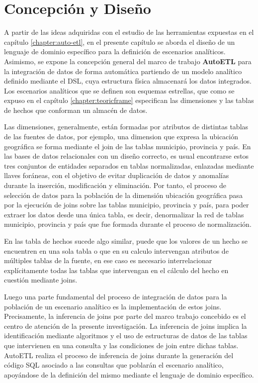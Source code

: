 \chapter{Concepción y Diseño}\label{chapter:proposal}

A partir de las ideas adquiridas con el estudio de las herramientas expuestas en el cap\'itulo \ref{chapter:auto-etl}, 
en el presente capítulo se aborda el diseño de un lenguaje de dominio específico para la definición de 
escenarios analíticos. Asimismo, se expone la concepción general del marco de trabajo \textbf{AutoETL} para la 
integración de datos de forma automática partiendo de un modelo analítico definido mediante el DSL, cuya estructura 
f\'isica almacenar\'a los datos integrados. Los escenarios analíticos que se definen son esquemas estrellas, que como 
se expuso en el cap\'itulo \ref{chapter:teoricframe} especifican las dimensiones y las tablas de hechos 
que conforman un almacén de datos. 

Las dimensiones, generalmente, están formadas por atributos de distintas tablas de
las fuentes de datos, por ejemplo, una dimension que expresa la ubicación geográfica
se forma mediante el join de las tablas municipio, provincia y país. En las bases de
datos relacionales con un diseño correcto, es usual encontrarse estos tres conjuntos de
entidades separados en tablas normalizadas, enlazadas mediante llaves foráneas, con
el objetivo de evitar duplicación de datos y anomalías durante la inserción, modificación
y eliminación. Por tanto, el proceso de selección de datos para la población de la
dimensión ubicación geográfica pasa por la ejecuci\'on de joins sobre las tablas municipio, provincia y país,
para poder extraer los datos desde una única tabla, es decir, denormalizar la red  
de tablas municipio, provincia y país que fue formada durante el proceso de normalización. 

En las tabla de hechos sucede algo similar, puede que los valores de un hecho se
encuentren en una sola tabla o que en su calculo intervengan atributos de múltiples
tablas de la fuente, en ese caso es necesario interrelacionar explícitamente todas las tablas que intervengan
en el cálculo del hecho en cuestión mediante joins.

Luego una parte fundamental del proceso de integración de datos para la población de un escenario analítico es
la implementación de estos joins. Precisamente, la inferencia de joins por parte del marco trabajo concebido es el centro de atención de la presente 
investigaci\'on. La inferencia de joins implica la identificaci\'on mediante algoritmos y el uso de estructuras de datos de 
las tablas que intervienen en una consulta y las condiciones de join entre dichas tablas.
AutoETL realiza el proceso de inferencia de joins durante la generaci\'on 
del c\'odigo SQL asociado a las consultas que poblar\'an el escenario analítico, apoy\'andose de la definición del mismo
mediante el lenguaje de dominio específico.

